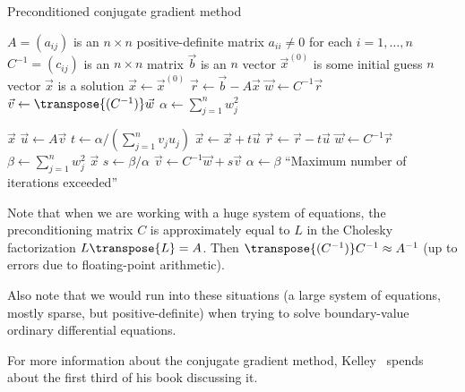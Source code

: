 \begin{algorithm}\label{alg:iterative-linear:conjugate-gradient}
  \caption{Preconditioned conjugate gradient method}
  \begin{algorithmic}[1]
    \Require $A=(a_{ij})$ is an $n\times n$ positive-definite matrix
    \Require $a_{ii}\neq0$ for each $i=1,\dots,n$
    \Require $C^{-1}=(c_{ij})$ is an $n\times n$ matrix
    \Require $\vec{b}$ is an $n$ vector
    \Require $\vec{x}^{(0)}$ is some initial guess $n$ vector
    \Ensure $\vec{x}$ is a solution
    \State $\vec{x}\gets\vec{x}^{(0)}$ 
    \State $\vec{r}\gets \vec{b}-A\vec{x}$
    \State $\vec{w}\gets C^{-1}\vec{r}$
    \State $\vec{v}\gets\transpose{(C^{-1})}\vec{w}$
    \State $\alpha\gets\sum^{n}_{j=1}w_{j}^{2}$

        \State\Return $\vec{x}$
      \EndIf
      \State $\vec{u}\gets A\vec{v}$
      \State $t\gets \alpha/(\sum^{n}_{j=1}v_{j}u_{j})$
      \State $\vec{x}\gets\vec{x}+t\vec{u}$
      \State $\vec{r}\gets\vec{r}-t\vec{u}$
      \State $\vec{w}\gets C^{-1}\vec{r}$
      \State $\beta\gets\sum^{n}_{j=1}w_{j}^{2}$
          \State\Return $\vec{x}$
        \EndIf
      \EndIf
      \State $s\gets\beta/\alpha$
      \State $\vec{v}\gets C^{-1}\vec{w}+s\vec{v}$
      \State $\alpha\gets\beta$
    \EndFor
    \State\Fail ``Maximum number of iterations exceeded''
  \EndFunction
\end{algorithmic}
\end{algorithm}

Note that when we are working with a huge system of equations, the
preconditioning matrix $C$ is approximately equal to $L$ in the Cholesky
factorization $L\transpose{L}=A$. Then
$\transpose{(C^{-1})}C^{-1}\approx A^{-1}$ (up to errors due to
floating-point arithmetic).

Also note that we would run into these situations (a large system of
equations, mostly sparse, but positive-definite) when trying to solve
boundary-value ordinary differential equations.

For more information about the conjugate gradient method,
Kelley~\cite{kelley1995} spends about the first third of his book
discussing it.

